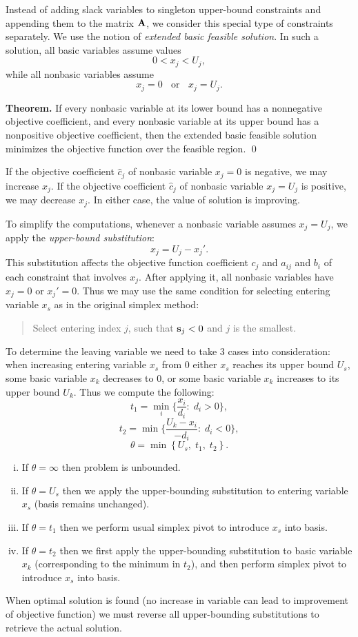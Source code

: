 \documentclass[10pt]{article}
\begin{document}
Instead of adding slack variables to singleton upper-bound constraints and appending them to the matrix ${\bf A}$, we consider this special type of constraints separately. We use the notion of {\it extended basic feasible solution}. In such a solution, all basic variables assume values 
$$0 < x_j < U_j,$$ 
while all nonbasic variables assume
$$ x_j = 0 \;\; \textrm{ or } \;\; x_j = U_j.$$

\medskip

{\bf Theorem.} If every nonbasic variable at its lower bound has a nonnegative objective coefficient, and every nonbasic variable at its upper bound has a nonpositive objective coefficient, then the extended basic feasible solution minimizes the objective function over the feasible region. \qed

\medskip

If the objective coefficient $\hat{c}_j$ of nonbasic variable $x_j = 0$ is negative, we may increase $x_j$. If the objective coefficient $\hat{c}_j$ of nonbasic variable $x_j = U_j$ is positive, we may decrease $x_j$. In either case, the value of solution is improving.

To simplify the computations, whenever a nonbasic variable assumes $x_j=U_j$, we apply the {\it upper-bound substitution}:
$$
    x_j = U_j - x_j'.
$$
This substitution affects the objective function coefficient $c_j$ and $a_{ij}$ and $b_i$ of each constraint that involves $x_j$. After applying it, all nonbasic variables have $x_j = 0$ or $x_j' = 0$. Thus we may use the same condition for selecting entering variable $x_s$ as in the original simplex method:

\begin{quote}
Select entering index $j$, such that ${\bf s}_j < 0$ and $j$ is the smallest.
\end{quote}

To determine the leaving variable we need to take 3 cases into consideration: when increasing entering variable $x_s$ from 0 either $x_s$ reaches its upper bound $U_s$, some basic variable $x_k$ decreases to 0, or some basic variable $x_k$ increases to its upper bound $U_k$. Thus we compute the following:
$$
    t_1 = \min_i \{ \frac{x_i}{d_i} : \; d_i > 0 \},
$$
$$
    t_2 = \min \{ \frac{U_k - x_i}{-d_i} : \; d_i < 0 \},
$$
$$
    \theta = \min \left\{ U_s, \; t_1, \; t_2 \right\}.
$$

\begin{enumerate}[i)]
    \item If $\theta = \infty$ then problem is unbounded.
    \item If $\theta = U_s$ then we apply the upper-bounding substitution to entering variable $x_s$ (basis remains unchanged).
    \item If $\theta = t_1$ then we perform usual simplex pivot to introduce $x_s$ into basis.
    \item If $\theta = t_2$ then we first apply the upper-bounding substitution to basic variable $x_k$ (corresponding to the minimum in $t_2$), and then perform simplex pivot to introduce $x_s$ into basis.
\end{enumerate}

When optimal solution is found (no increase in variable can lead to improvement of objective function) we must reverse all upper-bounding substitutions to retrieve the actual solution.
\end{document}
